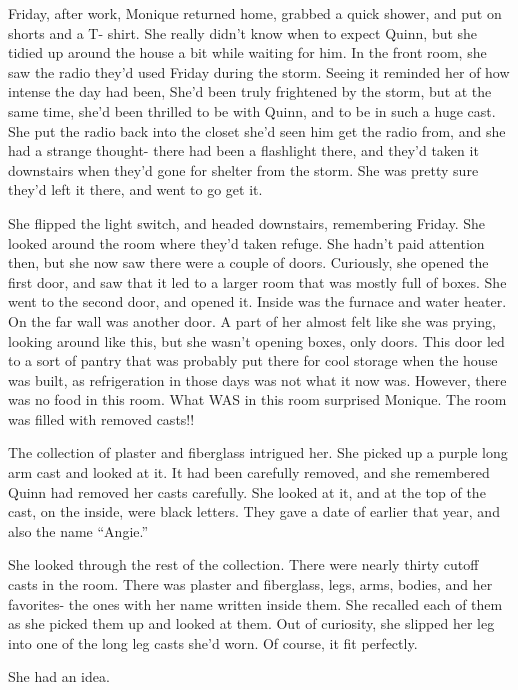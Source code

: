 \begin{thought}
Friday, after work, Monique returned home, grabbed a quick shower, and put on shorts and a
T- shirt. She really didn't know when to expect Quinn, but she tidied up around the house a bit
while waiting for him. In the front room, she saw the radio they'd used Friday during the storm.
Seeing it reminded her of how intense the day had been, She'd been truly frightened by the
storm, but at the same time, she'd been thrilled to be with Quinn, and to be in such a huge
cast. She put the radio back into the closet she'd seen him get the radio from, and she had a
strange thought- there had been a flashlight there, and they'd taken it downstairs when they'd
gone for shelter from the storm. She was pretty sure they'd left it there, and went to go get
it.

She flipped the light switch, and headed downstairs, remembering Friday. She looked around
the room where they'd taken refuge. She hadn't paid attention then, but she now saw there were a
couple of doors. Curiously, she opened the first door, and saw that it led to a larger room that
was mostly full of boxes. She went to the second door, and opened it. Inside was the furnace and
water heater. On the far wall was another door. A part of her almost felt like she was prying,
looking around like this, but she wasn't opening boxes, only doors. This door led to a sort of
pantry that was probably put there for cool storage when the house was built, as refrigeration
in those days was not what it now was. However, there was no food in this room. What WAS in this
room surprised Monique. The room was filled with removed casts!!

The collection of plaster and fiberglass intrigued her. She picked up a purple long arm
cast and looked at it. It had been carefully removed, and she remembered Quinn had removed her
casts carefully. She looked at it, and at the top of the cast, on the inside, were black
letters. They gave a date of earlier that year, and also the name ``Angie.''

She looked through the rest of the collection. There were nearly thirty cutoff casts in the
room. There was plaster and fiberglass, legs, arms, bodies, and her favorites- the ones with her
name written inside them. She recalled each of them as she picked them up and looked at them.
Out of curiosity, she slipped her leg into one of the long leg casts she'd worn. Of course, it
fit perfectly.

She had an idea.
\end{thought}

